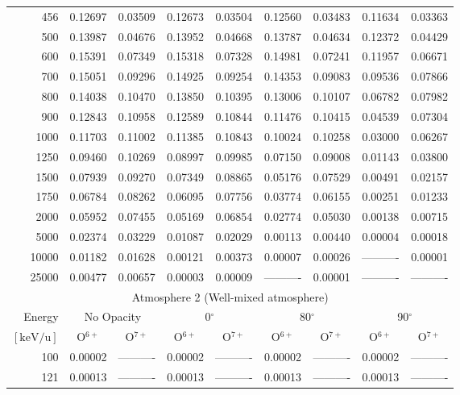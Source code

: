 \begin{table}[ht]
\begin{tabular}{r|c|c|c|c|c|c|c|c}
      456 & 0.12697 & 0.03509 & 0.12673 & 0.03504 & 0.12560 & 0.03483 & 0.11634 & 0.03363 \\
      500 & 0.13987 & 0.04676 & 0.13952 & 0.04668 & 0.13787 & 0.04634 & 0.12372 & 0.04429 \\
      600 & 0.15391 & 0.07349 & 0.15318 & 0.07328 & 0.14981 & 0.07241 & 0.11957 & 0.06671 \\
      700 & 0.15051 & 0.09296 & 0.14925 & 0.09254 & 0.14353 & 0.09083 & 0.09536 & 0.07866 \\
      800 & 0.14038 & 0.10470 & 0.13850 & 0.10395 & 0.13006 & 0.10107 & 0.06782 & 0.07982 \\
      900 & 0.12843 & 0.10958 & 0.12589 & 0.10844 & 0.11476 & 0.10415 & 0.04539 & 0.07304 \\
     1000 & 0.11703 & 0.11002 & 0.11385 & 0.10843 & 0.10024 & 0.10258 & 0.03000 & 0.06267 \\
     1250 & 0.09460 & 0.10269 & 0.08997 & 0.09985 & 0.07150 & 0.09008 & 0.01143 & 0.03800 \\
     1500 & 0.07939 & 0.09270 & 0.07349 & 0.08865 & 0.05176 & 0.07529 & 0.00491 & 0.02157 \\
     1750 & 0.06784 & 0.08262 & 0.06095 & 0.07756 & 0.03774 & 0.06155 & 0.00251 & 0.01233 \\
     2000 & 0.05952 & 0.07455 & 0.05169 & 0.06854 & 0.02774 & 0.05030 & 0.00138 & 0.00715 \\
     5000 & 0.02374 & 0.03229 & 0.01087 & 0.02029 & 0.00113 & 0.00440 & 0.00004 & 0.00018 \\
    10000 & 0.01182 & 0.01628 & 0.00121 & 0.00373 & 0.00007 & 0.00026 & ---------- & 0.00001 \\
    25000 & 0.00477 & 0.00657 & 0.00003 & 0.00009 & ---------- & 0.00001 & ---------- & ---------- \\ \cline{1-9}
    \multicolumn{9}{c}{Atmosphere 2 (Well-mixed atmosphere)} \\ \cline{2-9}
    Energy & \multicolumn{2}{c|}{No Opacity} & \multicolumn{2}{c|}{0$^\circ$} & \multicolumn{2}{c|}{80$^\circ$} & \multicolumn{2}{c}{90$^\circ$} \\ \cline{2-9}
    $\mathrm{[keV/u]}$ & O$^{6+}$ & O$^{7+}$ & O$^{6+}$ & O$^{7+}$ & O$^{6+}$ & O$^{7+}$ & O$^{6+}$ & O$^{7+}$ \\ \cline{1-9}
      100 & 0.00002 & ---------- & 0.00002 & ---------- & 0.00002 & ---------- & 0.00002 & ---------- \\
      121 & 0.00013 & ---------- & 0.00013 & ---------- & 0.00013 & ---------- & 0.00013 & ---------- \\

\end{tabular}
\end{table}
